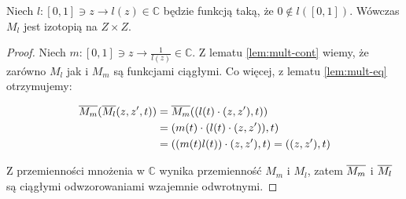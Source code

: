 \begin{lem} \label{lem:izotopy-generation}
  Niech $l: [0,1] \ni z \rightarrow l(z) \in \mathbb{C}$ będzie funkcją taką, że $0 \not\in l([0,1])$. Wówczas $M_l$ jest izotopią na $Z \times Z$.
  
  \begin{proof}
    Niech $m: [0,1] \ni z \rightarrow \frac{1}{l(z)} \in \mathbb{C}$. Z lematu \ref{lem:mult-cont} wiemy, że zarówno $M_l$ jak i $M_m$ są funkcjami ciągłymi. Co więcej, z lematu \ref{lem:mult-eq} otrzymujemy:
    
    \begin{align*}
      \overline{M_m}(\overline{M_l}(z, z', t)) &= \overline{M_m}((l(t) \cdot (z, z'), t)) \\
      &= (m(t) \cdot (l(t) \cdot (z,z')), t) \\
      &= ((m(t) l(t)) \cdot (z,z'), t) = ((z,z'), t)
    \end{align*}
    
    Z przemienności mnożenia w $\mathbb{C}$ wynika przemienność $M_m$ i $M_l$, zatem $\overline{M_m}$ i $\overline{M_l}$ są ciągłymi odwzorowaniami wzajemnie odwrotnymi.
  \end{proof}
\end{lem}


